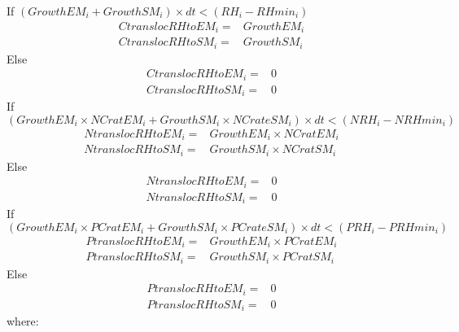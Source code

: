 If $(GrowthEM_i + GrowthSM_i) \times dt < (RH_i - RHmin_i)$
\begin{align}
             CtranslocRHtoEM_i =& GrowthEM_i \\
\nonumber    CtranslocRHtoSM_i =& GrowthSM_i
\end{align}
Else
\begin{align}
\nonumber    CtranslocRHtoEM_i =& 0 \\
\nonumber    CtranslocRHtoSM_i =& 0
\end{align}
%
If $(GrowthEM_i \times NCratEM_i + GrowthSM_i \times NCrateSM_i) \times dt < (NRH_i - NRHmin_i)$
\begin{align}
             NtranslocRHtoEM_i =& GrowthEM_i \times NCratEM_i \\
\nonumber    NtranslocRHtoSM_i =& GrowthSM_i \times NCratSM_i
\end{align}
Else
\begin{align}
\nonumber    NtranslocRHtoEM_i =& 0 \\
\nonumber    NtranslocRHtoSM_i =& 0
\end{align}
%
If $(GrowthEM_i \times PCratEM_i + GrowthSM_i \times PCrateSM_i) \times dt < (PRH_i - PRHmin_i)$
\begin{align}
             PtranslocRHtoEM_i =& GrowthEM_i \times PCratEM_i \\
\nonumber    PtranslocRHtoSM_i =& GrowthSM_i \times PCratSM_i
\end{align}
Else
\begin{align}
\nonumber    PtranslocRHtoEM_i =& 0 \\
\nonumber    PtranslocRHtoSM_i =& 0
\end{align}
%
where:

